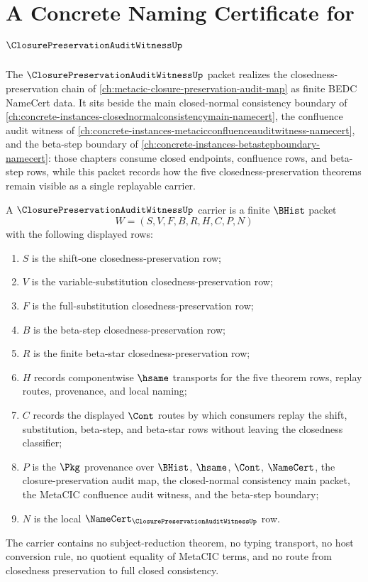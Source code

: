 \chapter{A Concrete Naming Certificate for $\ClosurePreservationAuditWitnessUp$}
\label{ch:concrete-instances-closurepreservationauditwitness-namecert}

The $\ClosurePreservationAuditWitnessUp$ packet realizes the closedness-preservation chain of \autoref{ch:metacic-closure-preservation-audit-map} as finite BEDC NameCert data. It sits beside the main closed-normal consistency boundary of \autoref{ch:concrete-instances-closednormalconsistencymain-namecert}, the confluence audit witness of \autoref{ch:concrete-instances-metacicconfluenceauditwitness-namecert}, and the beta-step boundary of \autoref{ch:concrete-instances-betastepboundary-namecert}: those chapters consume closed endpoints, confluence rows, and beta-step rows, while this packet records how the five closedness-preservation theorems remain visible as a single replayable carrier.

\begin{definition}
\label{def:closure-preservation-audit-witness-carrier}
A $\ClosurePreservationAuditWitnessUp$ carrier is a finite $\BHist$ packet
$$
W=(S,V,F,B,R,H,C,P,N)
$$
with the following displayed rows:
\begin{enumerate}
\item $S$ is the shift-one closedness-preservation row;
\item $V$ is the variable-substitution closedness-preservation row;
\item $F$ is the full-substitution closedness-preservation row;
\item $B$ is the beta-step closedness-preservation row;
\item $R$ is the finite beta-star closedness-preservation row;
\item $H$ records componentwise $\hsame$ transports for the five theorem rows, replay routes, provenance, and local naming;
\item $C$ records the displayed $\Cont$ routes by which consumers replay the shift, substitution, beta-step, and beta-star rows without leaving the closedness classifier;
\item $P$ is the $\Pkg$ provenance over $\BHist$, $\hsame$, $\Cont$, $\NameCert$, the closure-preservation audit map, the closed-normal consistency main packet, the MetaCIC confluence audit witness, and the beta-step boundary;
\item $N$ is the local $\NameCert_{\ClosurePreservationAuditWitnessUp}$ row.
\end{enumerate}
The carrier contains no subject-reduction theorem, no typing transport, no host conversion rule, no quotient equality of MetaCIC terms, and no route from closedness preservation to full closed consistency.
\end{definition}

